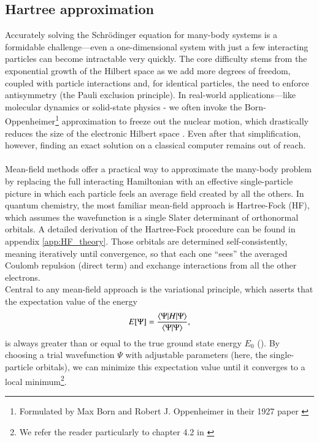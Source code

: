 \documentclass{subfiles}
\begin{document}
\subsection{Hartree approximation}\label{sec:hartree_theory}
Accurately solving the Schrödinger equation for many-body systems is a formidable challenge—even a one-dimensional system with just a few interacting particles can become intractable very quickly. The core difficulty stems from the exponential growth of the Hilbert space as we add more degrees of freedom, coupled with particle interactions and, for identical particles, the need to enforce antisymmetry (the Pauli exclusion principle). In real-world applications—like molecular dynamics or solid-state physics - we often invoke the Born-Oppenheimer\footnote{Formulated by Max Born and Robert J. Oppenheimer in their 1927 paper \cite{Born_Oppenheimer_1927}} approximation to freeze out the nuclear motion, which drastically reduces the size of the electronic Hilbert space \cite{helgaker2013molecular, szabo1996modern}. Even after that simplification, however, finding an exact solution on a classical computer remains out of reach.
\\ \\ 
Mean-field methods offer a practical way to approximate the many-body problem by replacing the full interacting Hamiltonian with an effective single-particle picture in which each particle feels an average field created by all the others. In quantum chemistry, the most familiar mean-field approach is Hartree-Fock (HF), which assumes the wavefunction is a single Slater determinant of orthonormal orbitals. A detailed derivation of the Hartree-Fock procedure can be found in appendix \ref{app:HF_theory}. Those orbitals are determined self-consistently, meaning iteratively until convergence, so that each one “sees” the averaged Coulomb repulsion (direct term) and exchange interactions from all the other electrons.
\\
Central to any mean-field approach is the variational principle, which asserts that the expectation value of the energy
\begin{equation}
    E[\Psi] = \frac{\braket{\Psi|H|\Psi}}{\braket{\Psi|\Psi}}\label{eq:variational_principle},
\end{equation}
is always greater than or equal to the true ground state energy $E_0$ (). By choosing a trial wavefunction $\Psi$ with adjustable parameters (here, the single-particle orbitals), we can minimize this expectation value until it converges to a local minimum\cite{helgaker2013molecular}\footnote{We refer the reader particularly to chapter 4.2 in \cite{helgaker2013molecular}}. 
\end{document}
